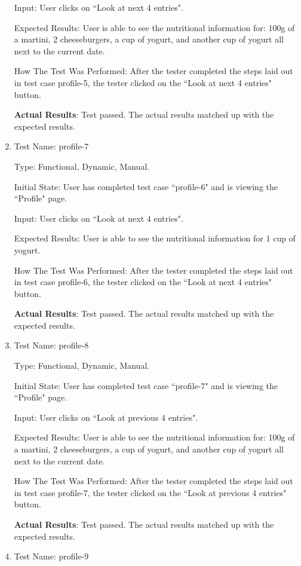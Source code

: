 \documentclass[12pt, titlepage]{article}
\begin{document}
\begin{enumerate}
		Input: User clicks on ``Look at next 4 entries".
		
		Expected Results: User is able to see the nutritional information for: 100g of a martini, 2 cheeseburgers, a cup of yogurt, and another cup of yogurt all next to the current date.
		
		How The Test Was Performed: After the tester completed the steps laid out in test case profile-5, the tester clicked on the ``Look at next 4 entries" button.
		
		\textbf{Actual Results}: Test passed. The actual results matched up with the expected results.
		
		\item{Test Name: profile-7}
		
		Type: Functional, Dynamic, Manual.
		
		Initial State: User has completed test case ``profile-6" and is viewing the ``Profile" page.
		
		Input: User clicks on ``Look at next 4 entries".
		
		Expected Results: User is able to see the nutritional information for 1 cup of yogurt.
		
		How The Test Was Performed: After the tester completed the steps laid out in test case profile-6, the tester clicked on the ``Look at next 4 entries" button.
		
		\textbf{Actual Results}: Test passed. The actual results matched up with the expected results.
		
		\item{Test Name: profile-8}
		
		Type: Functional, Dynamic, Manual.
		
		Initial State: User has completed test case ``profile-7" and is viewing the ``Profile" page.
		
		Input: User clicks on ``Look at previous 4 entries".
		
		Expected Results: User is able to see the nutritional information for: 100g of a martini, 2 cheeseburgers, a cup of yogurt, and another cup of yogurt all next to the current date.
		
		How The Test Was Performed: After the tester completed the steps laid out in test case profile-7, the tester clicked on the ``Look at previous 4 entries" button.
		
		\textbf{Actual Results}: Test passed. The actual results matched up with the expected results.
		
		\item{Test Name: profile-9}
		

\end{enumerate}
\end{document}
